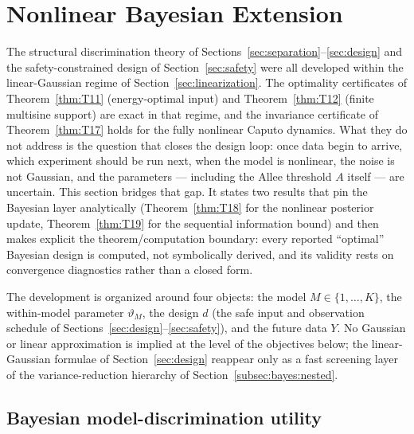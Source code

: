 \section{Nonlinear Bayesian Extension}
\label{sec:bayesian}

The structural discrimination theory of Sections~\ref{sec:separation}--\ref{sec:design} and the safety-constrained design of Section~\ref{sec:safety} were all developed within the linear-Gaussian regime of Section~\ref{sec:linearization}. The optimality certificates of Theorem~\ref{thm:T11} (energy-optimal input) and Theorem~\ref{thm:T12} (finite multisine support) are exact in that regime, and the invariance certificate of Theorem~\ref{thm:T17} holds for the fully nonlinear Caputo dynamics. What they do not address is the question that closes the design loop: once data begin to arrive, which experiment should be run next, when the model is nonlinear, the noise is not Gaussian, and the parameters --- including the Allee threshold $A$ itself --- are uncertain. This section bridges that gap. It states two results that pin the Bayesian layer analytically (Theorem~\ref{thm:T18} for the nonlinear posterior update, Theorem~\ref{thm:T19} for the sequential information bound) and then makes explicit the theorem/computation boundary: every reported ``optimal'' Bayesian design is computed, not symbolically derived, and its validity rests on convergence diagnostics rather than a closed form.

The development is organized around four objects: the model $M \in \{1,\dots,K\}$, the within-model parameter $\vartheta_M$, the design $d$ (the safe input and observation schedule of Sections~\ref{sec:design}--\ref{sec:safety}), and the future data $Y$. No Gaussian or linear approximation is implied at the level of the objectives below; the linear-Gaussian formulae of Section~\ref{sec:design} reappear only as a fast screening layer of the variance-reduction hierarchy of Section~\ref{subsec:bayes:nested}.

\subsection{Bayesian model-discrimination utility}

